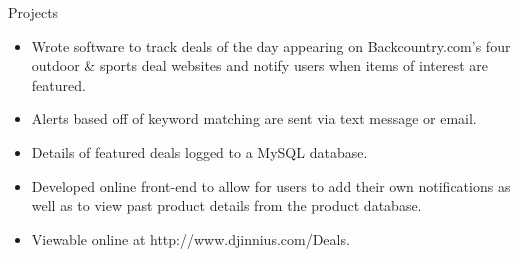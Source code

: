 \begin{category}{Projects}
\begin{itemize}
\item Wrote software to track deals of the day appearing on Backcountry.com's four outdoor \& sports deal websites and notify users when items of interest are featured.
\item Alerts based off of keyword matching are sent via text message or email.
\item Details of featured deals logged to a MySQL database. 
\item Developed online front-end to allow for users to add their own notifications as well as to view past product details from the product database.
\item Viewable online at http://www.djinnius.com/Deals.
\end{itemize}



\end{category}
